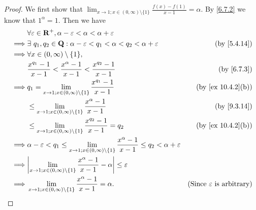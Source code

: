 \begin{proof}
  We first show that \(\lim_{x \to 1 ; x \in (0, \infty) \setminus \{1\}} \frac{f(x) - f(1)}{x - 1} = \alpha\).
  By \cref{6.7.2} we know that \(1^{\alpha} = 1\).
  Then we have
  \begin{align*}
             & \forall \varepsilon \in \R^+, \alpha - \varepsilon < \alpha < \alpha + \varepsilon                                                                                                            \\
    \implies & \exists\ q_1, q_2 \in \Q : \alpha - \varepsilon < q_1 < \alpha < q_2 < \alpha + \varepsilon                                                     & \text{(by \cref{5.4.14})}                   \\
    \implies & \forall x \in (0, \infty) \setminus \{1\},                                                                                                                                                    \\
             & \frac{x^{q_1} - 1}{x - 1} < \frac{x^{\alpha} - 1}{x - 1} < \frac{x^{q_2} - 1}{x - 1}                                                            & \text{(by \cref{6.7.3})}                    \\
    \implies & q_1 = \lim_{x \to 1 ; x \in (0, \infty) \setminus \{1\}} \frac{x^{q_1} - 1}{x - 1}                                                              & \text{(by \cref{ex 10.4.2}(b))}             \\
             & \leq \lim_{x \to 1 ; x \in (0, \infty) \setminus \{1\}} \frac{x^{\alpha} - 1}{x - 1}                                                            & \text{(by \cref{9.3.14})}                   \\
             & \leq \lim_{x \to 1 ; x \in (0, \infty) \setminus \{1\}} \frac{x^{q_2} - 1}{x - 1} = q_2                                                         & \text{(by \cref{ex 10.4.2}(b))}             \\
    \implies & \alpha - \varepsilon < q_1 \leq \lim_{x \to 1 ; x \in (0, \infty) \setminus \{1\}} \frac{x^{\alpha} - 1}{x - 1} \leq q_2 < \alpha + \varepsilon                                               \\
    \implies & \abs{\lim_{x \to 1 ; x \in (0, \infty) \setminus \{1\}} \frac{x^{\alpha} - 1}{x - 1} - \alpha} \leq \varepsilon                                                                               \\
    \implies & \lim_{x \to 1 ; x \in (0, \infty) \setminus \{1\}} \frac{x^{\alpha} - 1}{x - 1} = \alpha.                                                       & \text{(Since \(\varepsilon\) is arbitrary)}
  \end{align*}


\end{proof}
